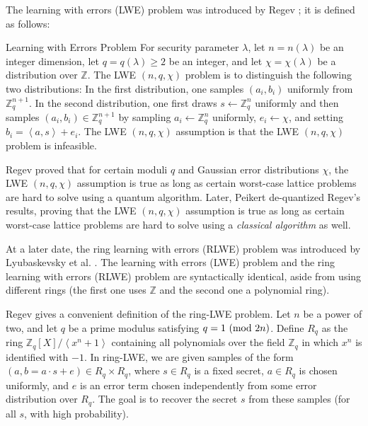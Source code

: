 The learning with errors (LWE) problem was introduced by Regev \cite{Regev:2005:LLE:1060590.1060603}; it is defined as follows:

\theoremstyle{definition}
\begin{definition}
{Learning with Errors Problem}
For security parameter $\lambda$, let $n = n(\lambda)$ be an integer dimension, let $q=q(\lambda) \geq 2$ be an integer, and let $\chi = \chi(\lambda)$ be a distribution over $\mathbb{Z}$. The LWE $(n, q, \chi)$ problem is to distinguish the following two distributions: In the first distribution, one samples $(a_{i},b_{i})$ uniformly from $\mathbb{Z}_{q}^{n+1}$. In the second distribution, one first draws $s \leftarrow \mathbb{Z}_{q}^{n}$ uniformly and then samples $(a_{i}, b_{i}) \in \mathbb{Z}_{q}^{n+1}$ by sampling $a_{i} \leftarrow \mathbb{Z}_{q}^{n}$ uniformly, $e_{i} \leftarrow \chi$, and setting $b_{i} = \left \langle a,s  \right \rangle + e_{i}$. The LWE $(n, q, \chi)$ assumption is that the LWE $(n, q, \chi)$ problem is infeasible.
\end{definition}

Regev proved that for certain moduli $q$ and Gaussian error distributions $\chi$, the LWE $(n, q, \chi)$ assumption is true as long as certain worst-case lattice problems are hard to solve using a quantum algorithm. Later, Peikert \cite{Peikert:2009:PCW:1536414.1536461} de-quantized Regev's results, proving that the LWE $(n, q, \chi)$ assumption is true as long as certain worst-case lattice problems are hard to solve using a \emph{classical algorithm} as well.

At a later date, the ring learning with errors (RLWE) problem was introduced by Lyubaskevsky et al. \cite{rlwe2010}. The learning with errors (LWE) problem and the ring learning with errors (RLWE) problem are syntactically identical, aside from using different rings (the first one uses $\mathbb{Z}$ and the second one a polynomial ring). 

Regev \cite{regevlearning} gives a convenient definition of the ring-LWE problem. Let $n$ be a power of two, and let $q$ be a prime modulus satisfying $q=1 \ (\text{mod}\ 2n)$. Define $R_{q}$ as the ring $\mathbb{Z}_{q}[X] / \left \langle x^{n} + 1 \right \rangle$ containing all polynomials over the field $\mathbb{Z}_{q}$ in which $x^{n}$ is identified with $-1$. In ring-LWE, we are given samples of the form $(a, b = a \cdot s + e) \in R_{q} \times R_{q}$, where $s \in R_{q}$ is a fixed secret, $a \in R_{q}$ is chosen uniformly, and $e$ is an error term chosen independently from some error distribution over $R_{q}$. The goal is to recover the secret $s$ from these samples (for all $s$, with high probability).

